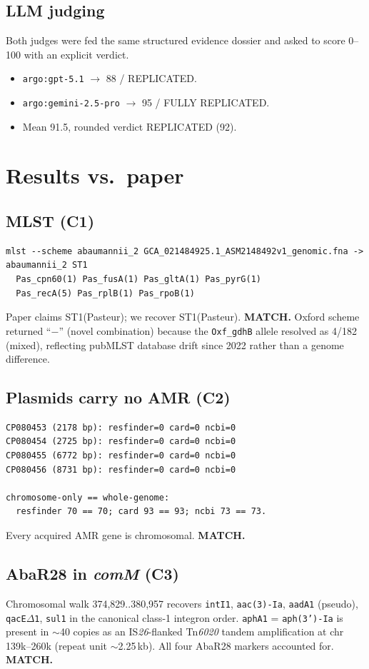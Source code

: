 \documentclass[11pt]{article}
\begin{document}
\subsection{LLM judging}
Both judges were fed the same structured evidence dossier and asked to
score 0--100 with an explicit verdict.
\begin{itemize}[nosep]
  \item \texttt{argo:gpt-5.1} $\to$ 88 / REPLICATED.
  \item \texttt{argo:gemini-2.5-pro} $\to$ 95 / FULLY REPLICATED.
  \item Mean 91.5, rounded verdict REPLICATED (92).
\end{itemize}

\section{Results vs.\ paper}

\subsection{MLST (C1)}
\begin{lstlisting}
mlst --scheme abaumannii_2 GCA_021484925.1_ASM2148492v1_genomic.fna -> abaumannii_2 ST1
  Pas_cpn60(1) Pas_fusA(1) Pas_gltA(1) Pas_pyrG(1)
  Pas_recA(5) Pas_rplB(1) Pas_rpoB(1)
\end{lstlisting}
Paper claims ST1(Pasteur); we recover ST1(Pasteur).  \textbf{MATCH.}
Oxford scheme returned ``$-$'' (novel combination) because the
\texttt{Oxf\_gdhB} allele resolved as 4/182 (mixed), reflecting
pubMLST database drift since 2022 rather than a genome difference.

\subsection{Plasmids carry no AMR (C2)}
\begin{lstlisting}
CP080453 (2178 bp): resfinder=0 card=0 ncbi=0
CP080454 (2725 bp): resfinder=0 card=0 ncbi=0
CP080455 (6772 bp): resfinder=0 card=0 ncbi=0
CP080456 (8731 bp): resfinder=0 card=0 ncbi=0

chromosome-only == whole-genome:
  resfinder 70 == 70; card 93 == 93; ncbi 73 == 73.
\end{lstlisting}
Every acquired AMR gene is chromosomal.  \textbf{MATCH.}

\subsection{AbaR28 in \emph{comM} (C3)}
Chromosomal walk 374{,}829..380{,}957 recovers \texttt{intI1},
\texttt{aac(3)-Ia}, \texttt{aadA1} (pseudo), \texttt{qacE$\Delta$1},
\texttt{sul1} in the canonical class-1 integron order.
\texttt{aphA1} = \texttt{aph(3')-Ia} is present in $\sim$40 copies as
an IS\emph{26}-flanked Tn\emph{6020} tandem amplification at
chr 139k--260k (repeat unit $\sim$2.25\,kb).
All four AbaR28 markers accounted for.  \textbf{MATCH.}
\end{document}
